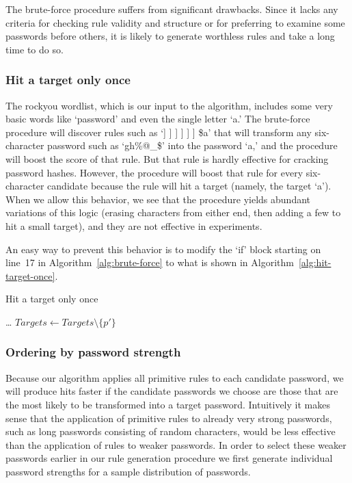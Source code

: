 \documentclass[letterpaper,twocolumn,10pt]{article}
\begin{document}
The brute-force procedure suffers from significant drawbacks. Since it lacks
any criteria for checking rule validity and structure or for preferring to
examine some passwords before others, it is likely to generate worthless rules
and take a long time to do so.

\subsubsection{Hit a target only once}

The rockyou wordlist, which is our input to the algorithm, includes some very
basic words like `password' and even the single letter `a.' The brute-force
procedure will discover rules such as `] ] ] ] ] ] \$a' that will transform any
six-character password such as `gh\%@\_\$' into the password `a,' and the
procedure will boost the score of that rule. But that rule is hardly effective
for cracking password hashes. However, the procedure will boost that rule for
every six-character candidate because the rule will hit a target (namely, the
target `a'). When we allow this behavior, we see that the procedure yields
abundant variations of this logic (erasing characters from either end, then
adding a few to hit a small target), and they are not effective in experiments.

An easy way to prevent this behavior is to modify the `if' block starting on
line~17 in Algorithm~\ref{alg:brute-force} to what is shown in
Algorithm~\ref{alg:hit-target-once}.

\begin{algorithm}\caption{Hit a target only once}
\begin{algorithmic}
        \State \dots
      \EndFor
      \State $Targets \gets Targets \setminus \{p'\}$
    \EndIf
\end{algorithmic}
\label{alg:hit-target-once}
\end{algorithm}

\subsubsection{Ordering by password strength}

Because our algorithm applies all primitive rules to each candidate password,
we will produce hits faster if the candidate passwords we choose are those that
are the most likely to be transformed into a target password. Intuitively it makes
sense that the application of primitive rules to already very strong passwords, such as long
passwords consisting of random characters, would be less effective than the application
of rules to weaker passwords. In order to select these weaker passwords earlier in
our rule generation procedure we first generate individual password strengths for
a sample distribution of passwords.
\end{document}
